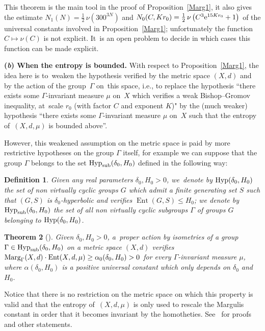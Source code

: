\documentclass[pdftex]{sigma}
\numberwithin{equation}{section}
\newtheorem{theor}{Theorem}[section]
\newtheorem{defi}[theor]{Definition}
\newcommand{\Ent}{\operatorname{Ent}}
\begin{document}
This theorem is the main tool in the proof of Proposition~\ref{Marg1}, it
also gives the estimate $N_1 (N) = \frac{1}{2} \,\nu \left(300^{3N}\right)$
and $N_0 (C, K r_0) = \frac{1}{2} \,\nu \left(C^3 {\rm e}^{15 K r_0} + 1\right)$ of the
universal constants involved in Proposition~\ref{Marg1}; unfortunately the function $C \mapsto \nu (C)$ is not explicit. It~is an open problem to decide in
which cases this function can be made explicit.

\medskip\noindent
{\bf (\emph{b}) When the entropy is bounded.}
With respect to Proposition~\ref{Marg1}, the idea here is to~weaken the hypothesis verified by the metric space $(X,d)$ and by the action of the group~$\Gamma$ on~this space, i.e., to replace the hypothesis ``there exists some $\Gamma$-invariant measure $\mu$ on~$X$ which verifies a weak Bishop--Gromov inequality, at~scale $r_0$ (with factor $C$ and exponent $K$)"
by the (much weaker) hypothesis ``there exists some
$\Gamma$-invariant measure $\mu$ on~$X$ such that the entropy of~$(X,d, \mu)$ is bounded above''.

However, this weakened assumption on the metric space is paid by more restrictive hypotheses on the group $\Gamma$ itself, for example we can suppose
that the group $\Gamma$ belongs to the set $\text{\rm Hyp}_{\rm sub} (\delta_0, H_0)$ defined in the following way:

\begin{defi}%
Given any real parameters $\delta_0, H_0 > 0$, we~denote by $\text{\rm Hyp} (\delta_0, H_0)$ the set of non virtually cyclic groups $G$ which admit a
finite generating set $S$ such that $(G, S)$ is $\delta_0$-hyperbolic and verifies $\Ent (G, S) \le H_0 $; we denote by $\text{\rm Hyp}_{\rm sub}
(\delta_0, H_0)$ the set of all non virtually cyclic subgroups $\Gamma$ of groups $G$ belonging to $\text{\rm Hyp}(\delta_0, H_0)$.
\end{defi}

\begin{theor}[{\cite[Theorem~6.13(ii)]{BCGS}}]\label{transportnil}
Given $\delta_0, H_0 > 0$, a~proper action by isometries of a group $\Gamma \in \text{\rm Hyp}_{\rm sub} (\delta_0, H_0)$ on
a metric space $ (X, d) $ verifies $\text{\rm Marg}_\Gamma (X, d) \cdot
\Ent (X,d, \mu) \ge \alpha_0 (\delta_0, H_0) > 0$ for every $\Gamma$-invariant
measure $\mu$, where $\alpha (\delta_0, H_0)$ is a positive universal constant which only depends on $\delta_0$ and $H_0$.
\end{theor}
Notice that there is no restriction on the metric space on which this property is valid and that the entropy of~$(X,d, \mu)$ is only used to rescale the Margulis
constant in order that it becomes invariant by the homotheties.
See~\cite[Theorem~6.13]{BCGS} for proofs and other statements.
\end{document}
